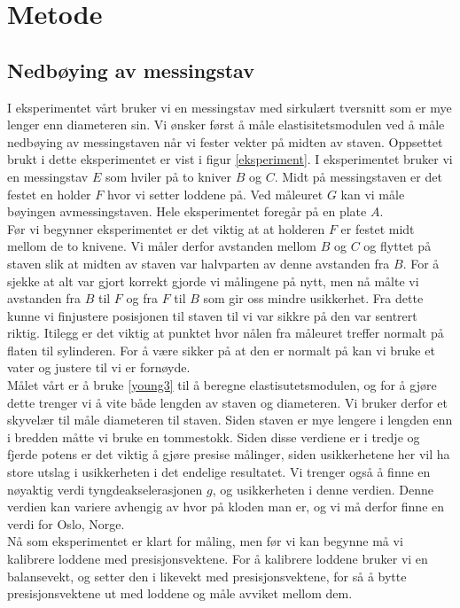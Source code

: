 \documentclass[%
 reprint,
 amsmath,amssymb,
 aps,
]{revtex4-1}
\begin{document}
\section{Metode}
\subsection{Nedbøying av messingstav}
I eksperimentet vårt bruker vi en messingstav med sirkulært tversnitt som er mye lenger enn diameteren sin. Vi ønsker først å måle elastisitetsmodulen ved å måle nedbøying av messingstaven når vi fester vekter på midten av staven. Oppsettet brukt i dette eksperimentet er vist i figur \vref{eksperiment}. I eksperimentet bruker vi en messingstav $E$ som hviler på to kniver $B$ og $C$. Midt på messingstaven er det festet en holder $F$ hvor vi setter loddene på. Ved måleuret $G$ kan vi måle bøyingen avmessingstaven. Hele eksperimentet foregår på en plate $A$.\\
Før vi begynner eksperimentet er det viktig at at holderen $F$ er festet midt mellom de to knivene. Vi måler derfor avstanden mellom $B$ og $C$ og flyttet på staven slik at midten av staven var halvparten av denne avstanden fra $B$. For å sjekke at alt var gjort korrekt gjorde vi målingene på nytt, men nå målte vi avstanden fra $B$ til $F$ og fra $F$ til $B$ som gir oss mindre usikkerhet. Fra dette kunne vi finjustere posisjonen til staven til vi var sikkre på den var sentrert riktig. Itilegg er det viktig at punktet hvor nålen fra måleuret treffer normalt på flaten til sylinderen. For å være sikker på at den er normalt på kan vi bruke et vater og justere til vi er fornøyde.\\
Målet vårt er å bruke \eqref{young3} til å beregne elastisutetsmodulen, og for å gjøre dette trenger vi å vite både lengden av staven og diameteren. Vi bruker derfor et skyvelær til måle diameteren til staven. Siden staven er mye lengere i lengden enn i bredden måtte vi bruke en tommestokk. Siden disse verdiene er i tredje og fjerde potens er det viktig å gjøre presise målinger, siden usikkerhetene her vil ha store utslag i usikkerheten i det endelige resultatet. Vi trenger også å finne en nøyaktig verdi tyngdeakselerasjonen $g$, og usikkerheten i denne verdien. Denne verdien kan variere avhengig av hvor på kloden man er, og vi må derfor finne en verdi for Oslo, Norge. \\
Nå som eksperimentet er klart for måling, men før vi kan begynne må vi kalibrere loddene med presisjonsvektene. For å kalibrere loddene bruker vi en balansevekt, og setter den i likevekt med presisjonsvektene, for så å bytte presisjonsvektene ut med loddene og måle avviket mellom dem.
\end{document}
